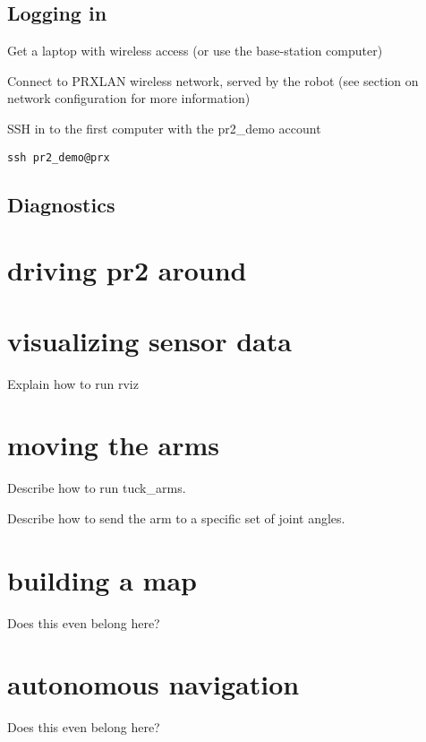 \subsection{Logging in}
Get a laptop with wireless access (or use the base-station computer)

Connect to PRXLAN wireless network, served by the robot (see section on network configuration for more information)

SSH in to the first computer with the pr2\_demo account
\begin{verbatim}
ssh pr2_demo@prx
\end{verbatim}


\subsection{Diagnostics}
\section{driving pr2 around}
\section{visualizing sensor data}
Explain how to run rviz
\section{moving the arms}
Describe how to run tuck\_arms.

Describe how to send the arm to a specific set of joint angles.
\section{building a map}
Does this even belong here?
\section{autonomous navigation}
Does this even belong here?

